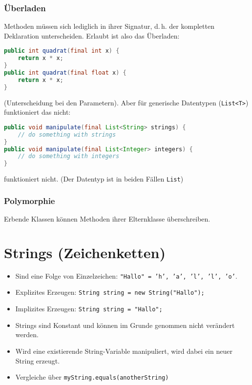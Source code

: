 \subsubsection{Überladen}
Methoden müssen sich lediglich in ihrer Signatur, d.\,h. der kompletten Deklaration unterscheiden. Erlaubt ist also das Überladen:
\begin{lstlisting}[language=Java]
public int quadrat(final int x) {
	return x * x;
}
public int quadrat(final float x) {
	return x * x;
}
\end{lstlisting}
(Unterscheidung bei den Parametern). Aber für generische Datentypen (\texttt{List<T>}) funktioniert das nicht:
\begin{lstlisting}[language=Java]
public void manipulate(final List<String> strings) {
	// do something with strings
}
public void manipulate(final List<Integer> integers) {
	// do something with integers
}
\end{lstlisting}
funktioniert nicht. (Der Datentyp ist in beiden Fällen \texttt{List})

\subsubsection{Polymorphie}
Erbende Klassen können Methoden ihrer Elternklasse überschreiben.

\section{Strings (Zeichenketten)}
\begin{itemize}\itemsep0em
	\item Sind eine Folge von Einzelzeichen: \texttt{"Hallo" = 'h', 'a', 'l', 'l', 'o'}.
	\item Explizites Erzeugen: \texttt{String string = new String("Hallo");}
	\item Implizites Erzeugen: \texttt{String string = "Hallo";}
	\item Strings sind Konstant und können im Grunde genommen nicht verändert werden.
	\item Wird eine existierende String-Variable manipuliert, wird dabei ein neuer String erzeugt.
	\item Vergleiche über \texttt{myString.equals(anotherString)}
\end{itemize}

